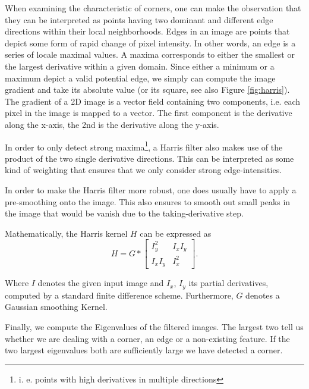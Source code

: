 \documentclass[conference]{IEEEtran}
\begin{document}
When examining the characteristic of corners, 
one can make the observation that they can be interpreted as points having two dominant and different edge directions
within their local neighborhoods. 
Edges in an image are points that depict some form of rapid change of pixel intensity.
 In other words, an edge is a series of locale maximal values. 
 A maxima corresponds to either the smallest or the largest derivative within a given domain. 
 Since either a minimum or a maximum depict a valid potential edge, we simply can compute the image gradient and take its absolute value (or its square, see also Figure \ref{fig:harris}). 
 The gradient of a 2D image is a vector field containing two components, i.e. each pixel in the image is mapped to a vector. 
 The first component is the derivative along the x-axis, the 2nd is the derivative along the y-axis. 

In order to only detect strong maxima\footnote{i. e. points with high derivatives in multiple directions}, 
a Harris filter also makes use of the product of the two single derivative directions. 
This can be interpreted as some kind of weighting that ensures that we only consider strong edge-intensities. 

In order to make the Harris filter more robust, one does usually have to apply a pre-smoothing onto the image. This also ensures to smooth out small peaks in the image that would be vanish due to the taking-derivative step. 

Mathematically, the Harris kernel $H$ can be expressed as 
\begin{equation}
H = G * 
\begin{bmatrix}
 I_y^2  & I_x I_y \\
 I_x I_y & I_x^2
\end{bmatrix}
.
\end{equation}

Where $I$ denotes the given input image and $I_x$, $I_y$ its partial derivatives, computed by a standard finite difference scheme. Furthermore, $G$ denotes a Gaussian smoothing Kernel. 

Finally, we compute the Eigenvalues of the filtered images. The largest two tell us whether we are dealing with a corner, an edge or a non-existing feature. If the two largest eigenvalues both are sufficiently large we have detected a corner.
\end{document}
